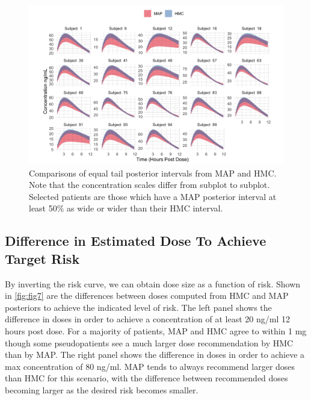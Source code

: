 \clearpage
\begin{figure}
\centering
	\includegraphics[width=1\linewidth]{figs/intervals}
	\caption{Comparisons of equal tail posterior intervals from MAP and HMC. Note that the concentration scales differ from subplot to subplot.  Selected patients are those which have a MAP posterior interval at least 50\% as wide or wider than their HMC interval.}
	\label{fig:fig6}
\end{figure}
\clearpage

\subsection*{Difference in Estimated Dose To Achieve Target Risk}


By inverting the risk curve, we can obtain dose size as a function of risk.  Shown in \cref{fig:fig7} are the differences between doses computed from HMC and MAP posteriors to achieve the indicated level of risk.  The left panel shows the difference in doses in order to achieve a concentration of at least 20 ng/ml 12 hours post dose. For a majority of patients, MAP and HMC agree to within 1 mg though some pseudopatients see a much larger dose recommendation by HMC than by MAP.  The right panel shows the difference in doses in order to achieve a max concentration of 80 ng/ml.  MAP tends to always recommend larger doses than HMC for this scenario, with the difference between recommended doses becoming larger as the desired risk becomes smaller.

